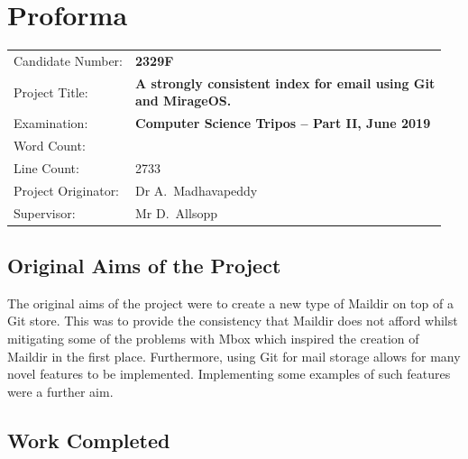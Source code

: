 \documentclass[12pt,a4paper,twoside,openright]{report}
\begin{document}
\chapter*{Proforma}

\begin{adjustbox}{width={\textwidth},totalheight={\textheight},keepaspectratio}%
{\large
\begin{tabular}{ll}
Candidate Number:   & \bf 2329F \\
Project Title:      & \makecell[l]{\bf A strongly consistent index for email using Git \\ \bf and MirageOS.} \\
Examination:        & \bf Computer Science Tripos -- Part II, June 2019 \\
Word Count:         & \bf \unskip\footnotemark[1] \\
Line Count:         & 2733\footnotemark[2] \\
Project Originator: & Dr A.~Madhavapeddy \\
Supervisor:         & Mr D.~Allsopp \\
\end{tabular}
}
\end{adjustbox}



\section*{Original Aims of the Project}

The original aims of the project were to create a new type of Maildir on top of a Git store. This was to provide the consistency that Maildir does not afford whilst mitigating some of the problems with Mbox which inspired the creation of Maildir in the first place. Furthermore, using Git for mail storage allows for many novel features to be implemented. Implementing some examples of such features were a further aim.

\section*{Work Completed}
\end{document}
